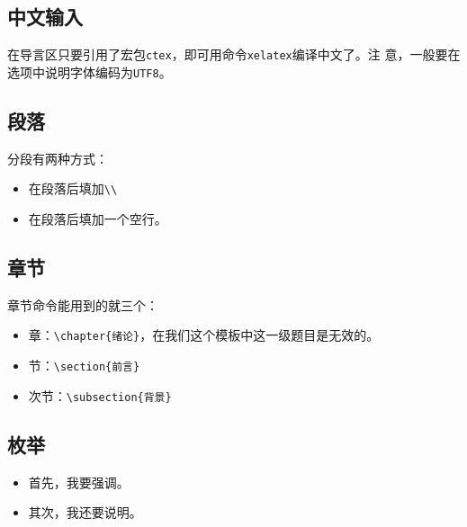 \subsection{中文输入}

在导言区只要引用了宏包\verb!ctex!，即可用命令\verb!xelatex!编译中文了。注
意，一般要在选项中说明字体编码为\verb!UTF8!。

\begin{code}
  \usepackage[UTF8]{ctex}
\end{code}

\subsection{段落}

分段有两种方式：
\begin{itemize}
\item 在段落后填加\verb!\\!
\item 在段落后填加一个空行。
\end{itemize}

\subsection{章节}

章节命令能用到的就三个：
\begin{itemize}
\item 章：\verb!\chapter{绪论}!，在我们这个模板中这一级题目是无效的。
\item 节：\verb!\section{前言}!
\item 次节：\verb!\subsection{背景}!
\end{itemize}

\subsection{枚举}

\begin{codeout}
  \begin{itemize}
  \item 首先，我要强调。
  \item 其次，我还要说明。
  \end{itemize}
\end{codeout}

